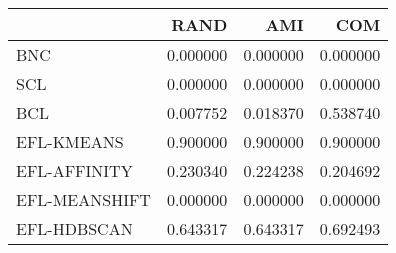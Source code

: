 \begin{tabular}{lrrr}
\toprule
 & RAND & AMI & COM \\
\midrule
BNC & 0.000000 & 0.000000 & 0.000000 \\
SCL & 0.000000 & 0.000000 & 0.000000 \\
BCL & 0.007752 & 0.018370 & 0.538740 \\
EFL-KMEANS & 0.900000 & 0.900000 & 0.900000 \\
EFL-AFFINITY & 0.230340 & 0.224238 & 0.204692 \\
EFL-MEANSHIFT & 0.000000 & 0.000000 & 0.000000 \\
EFL-HDBSCAN & 0.643317 & 0.643317 & 0.692493 \\
\bottomrule
\end{tabular}
